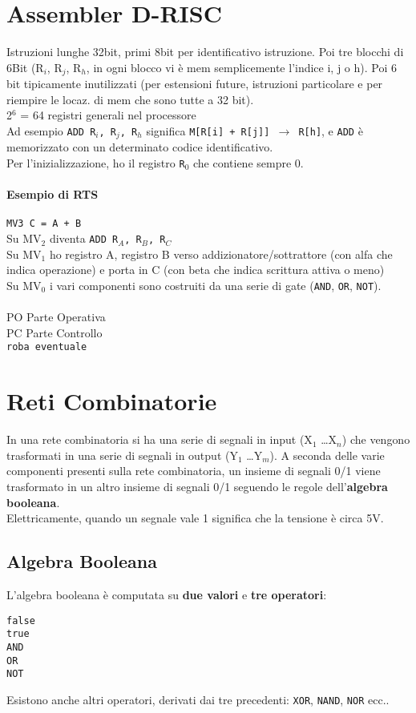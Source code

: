 \documentclass[10pt]{report}
\begin{document}
\section{Assembler D-RISC}
Istruzioni lunghe 32bit, primi 8bit per identificativo istruzione. Poi tre blocchi di 6Bit (R$_{i}$, R$_{j}$, R$_{h}$, in ogni blocco vi è mem semplicemente l'indice i, j o h). Poi 6 bit tipicamente inutilizzati (per estensioni future, istruzioni particolare e per riempire le locaz. di mem che sono tutte a 32 bit).\\
2$^{6}$ = 64 registri generali nel processore\\
Ad esempio \texttt{ADD R$_{i}$, R$_{j}$, R$_{h}$} significa \texttt{M[R[i] + R[j]] $\rightarrow$ R[h]}, e \texttt{ADD} è memorizzato con un determinato codice identificativo.\\
Per l'inizializzazione, ho il registro \texttt{R$_{0}$} che contiene sempre 0.

\paragraph{Esempio di RTS} \texttt{MV3 C = A + B}\\
Su MV$_{2}$ diventa \texttt{ADD R$_{A}$, R$_{B}$, R$_{C}$}\\
Su MV$_{1}$ ho registro A, registro B verso addizionatore/sottrattore (con alfa che indica operazione) e porta in C (con beta che indica scrittura attiva o meno)\\
Su MV$_{0}$ i vari componenti sono costruiti da una serie di gate (\texttt{AND}, \texttt{OR}, \texttt{NOT}).\\
\\
PO Parte Operativa\\
PC Parte Controllo\\
\texttt{roba eventuale}
\section{Reti Combinatorie}
In una rete combinatoria si ha una serie di segnali in input (X$_{1}$ \ldots X$_{n}$) che vengono trasformati in una serie di segnali in output (Y$_{1}$ \ldots Y$_{m}$). A seconda delle varie componenti presenti sulla rete combinatoria, un insieme di segnali 0/1 viene trasformato in un altro insieme di segnali 0/1 seguendo le regole dell'\textbf{algebra booleana}.\\
Elettricamente, quando un segnale vale 1 significa che la tensione è circa 5V.
\subsection{Algebra Booleana}
L'algebra booleana è computata su \textbf{due valori} e \textbf{tre operatori}:
\begin{center}
\begin{multicols}{2}
\texttt{false}\\\texttt{true}\\
\columnbreak
\texttt{AND}\\\texttt{OR}\\\texttt{NOT}
\end{multicols}
\end{center}
Esistono anche altri operatori, derivati dai tre precedenti: \texttt{XOR}, \texttt{NAND}, \texttt{NOR} ecc..
\end{document}
